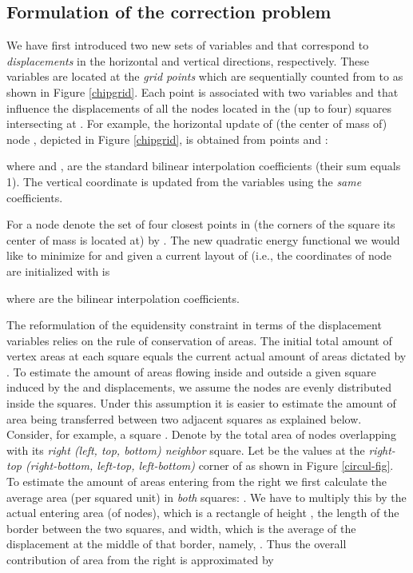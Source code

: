 \documentclass[final]{siamltex}
\begin{document}
\subsection{Formulation of the correction problem}\label{sProbRef}
\par We have first introduced two new sets of variables  and  that correspond to {\it displacements}
 in the horizontal
 and vertical directions, respectively. These variables are located at the {\it grid points} 
which are sequentially counted from  to  as shown in Figure \ref{chipgrid}.
 Each point  is associated with two variables  and  that influence the
 displacements
 of all the nodes located in the (up to four) squares intersecting at .
 For example, the horizontal update of (the center of mass of) node ,
 depicted in Figure \ref{chipgrid}, is obtained
 from points  and :

where  and , are
the standard bilinear interpolation coefficients (their sum equals
1). The vertical coordinate  is updated from the 
variables using the {\it same} coefficients.
\par For a node  denote the
set of four closest points in  (the corners of the square
its center of mass is located at) by .
The new quadratic energy functional we
would like to minimize for  and  given a current layout
 of  (i.e., the coordinates of node 
are initialized with  is

where  are the bilinear interpolation
coefficients.
\par The reformulation of the equidensity constraint in
terms of the displacement variables relies on the rule of
conservation of areas. The initial total amount of vertex areas at
each square equals the current actual amount of areas dictated by
. To estimate the amount of areas flowing
inside and outside a given square induced by the  and 
displacements, we assume the nodes are evenly distributed inside
the squares. Under this assumption it is easier to estimate the
amount of area being transferred between two adjacent squares as
explained below. Consider, for example, a square . Denote by
 the total area of nodes overlapping with its
{\it right (left, top, bottom) neighbor} square. Let
 be the  values at the {\it right-top
(right-bottom, left-top, left-bottom)} corner of  as shown in
Figure \ref{circul-fig}. To estimate the amount of areas entering
 from the right we first calculate the average area (per
squared unit) in {\it both} squares: .
We have to multiply this by the actual entering area (of nodes),
which is a rectangle of height , the length of the border
between the two squares, and width, which is the average of the 
displacement at the middle of that border, namely,
. Thus the overall contribution of area from
the right is approximated by
\end{document}

